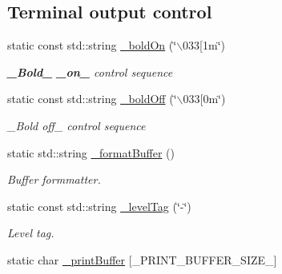 \subsection*{Terminal output control}
\begin{CompactItemize}
\item 
\hypertarget{namespaceServices_1_1Messaging_a67f79e9afafc7e80a80c7543135fc65}{
static const std::string \hyperlink{namespaceServices_1_1Messaging_a67f79e9afafc7e80a80c7543135fc65}{\_\-bold\-On} (\char`\"{}$\backslash$033\mbox{[}1m\char`\"{})}
\label{namespaceServices_1_1Messaging_a67f79e9afafc7e80a80c7543135fc65}

\begin{CompactList}\small\item\em {\bf \_\-Bold\_\-} {\bf \_\-on\_\-} control sequence \item\end{CompactList}\item 
\hypertarget{namespaceServices_1_1Messaging_d4d6965a37cad651384fdadf310402fb}{
static const std::string \hyperlink{namespaceServices_1_1Messaging_d4d6965a37cad651384fdadf310402fb}{\_\-bold\-Off} (\char`\"{}$\backslash$033\mbox{[}0m\char`\"{})}
\label{namespaceServices_1_1Messaging_d4d6965a37cad651384fdadf310402fb}

\begin{CompactList}\small\item\em \_\-Bold off\_\- control sequence \item\end{CompactList}\item 
\hypertarget{namespaceServices_1_1Messaging_6bbf3e92c7c50ce703d1c11ec6e56017}{
static std::string \hyperlink{namespaceServices_1_1Messaging_6bbf3e92c7c50ce703d1c11ec6e56017}{\_\-format\-Buffer} ()}
\label{namespaceServices_1_1Messaging_6bbf3e92c7c50ce703d1c11ec6e56017}

\begin{CompactList}\small\item\em Buffer formmatter. \item\end{CompactList}\item 
\hypertarget{namespaceServices_1_1Messaging_72875f360ba4154b96642d5f0c9a2a34}{
static const std::string \hyperlink{namespaceServices_1_1Messaging_72875f360ba4154b96642d5f0c9a2a34}{\_\-level\-Tag} (\char`\"{}-\char`\"{})}
\label{namespaceServices_1_1Messaging_72875f360ba4154b96642d5f0c9a2a34}

\begin{CompactList}\small\item\em Level tag. \item\end{CompactList}\item 
\hypertarget{namespaceServices_1_1Messaging_99e6bac00bfa1a834d0159d7bfdefb00}{
static char \hyperlink{namespaceServices_1_1Messaging_99e6bac00bfa1a834d0159d7bfdefb00}{\_\-print\-Buffer} \mbox{[}\_\-PRINT\_\-BUFFER\_\-SIZE\_\-\mbox{]}}
\label{namespaceServices_1_1Messaging_99e6bac00bfa1a834d0159d7bfdefb00}


\end{CompactItemize}
